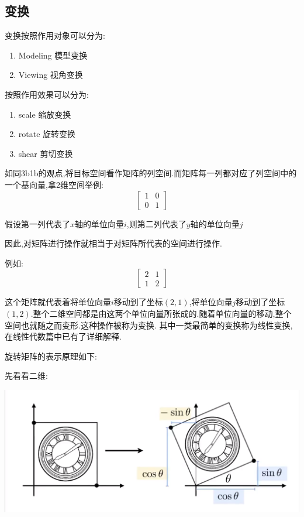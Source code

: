 \documentclass[UTF8,12pt]{ctexbook}
\begin{document}
{{{    \subsection{变换}{
      变换按照作用对象可以分为:
      \begin{enumerate}
        \item Modeling 模型变换
        \item Viewing 视角变换
      \end{enumerate}

      按照作用效果可以分为:
      \begin{enumerate}
        \item scale 缩放变换
        \item rotate 旋转变换
        \item shear 剪切变换
      \end{enumerate}

      如同3b1b的观点,将目标空间看作矩阵的列空间.而矩阵每一列都对应了列空间中的一个基向量,拿2维空间举例:
      $$
        \begin{bmatrix}
          1 & 0 \\
          0 & 1
        \end{bmatrix}
      $$

      假设第一列代表了$x$轴的单位向量$i$,则第二列代表了$y$轴的单位向量$j$

      因此,对矩阵进行操作就相当于对矩阵所代表的空间进行操作.

      例如:$$
        \begin{bmatrix}
          2 & 1 \\
          1 & 2
        \end{bmatrix}
      $$

      这个矩阵就代表着将单位向量$i$移动到了坐标$(2,1)$,将单位向量$j$移动到了坐标$(1,2)$.整个二维空间都是由这两个单位向量所张成的.随着单位向量的移动,整个空间也就随之而变形.这种操作被称为变换.
      其中一类最简单的变换称为线性变换,在线性代数篇中已有了详细解释.

      旋转矩阵的表示原理如下:

      先看看二维:

      \includegraphics[scale=0.25]{resources/rotateMatrixGraphics.png}

}}}}
\end{document}
